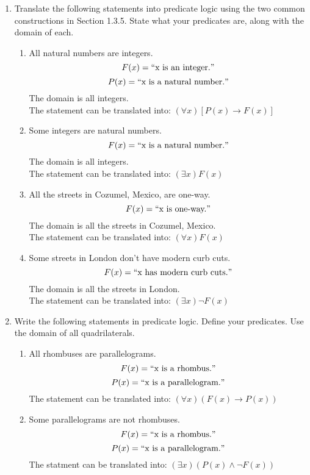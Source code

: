 \documentclass[12pt]{article}
\begin{document}
\begin{enumerate}
      \item Translate the following statements into predicate logic using the two common constructions in Section 1.3.5. State what your predicates are, along with the domain of each.
            \begin{enumerate}
                  \item All natural numbers are integers.
                        \[F(x) = \text{\textquotedblleft} \text{x is an integer.} \text{\textquotedblright}\]
                        \[P(x) = \text{\textquotedblleft} \text{x is a natural number.} \text{\textquotedblright}\]
                        The domain is all integers.\\
                        The statement can be translated into: $(\forall x)[P(x) \rightarrow F(x)]$
                  \item Some integers are natural numbers.
                        \[F(x) = \text{\textquotedblleft} \text{x is a natural number.} \text{\textquotedblright}\]
                        The domain is all integers.\\
                        The statement can be translated into: $(\exists x)F(x)$
                  \item All the streets in Cozumel, Mexico, are one-way.
                        \[F(x) = \text{\textquotedblleft} \text{x is one-way.} \text{\textquotedblright}\]
                        The domain is all the streets in Cozumel, Mexico.\\
                        The statement can be translated into: $(\forall x)F(x)$
                  \item Some streets in London don’t have modern curb cuts.
                        \[F(x) = \text{\textquotedblleft} \text{x has modern curb cuts.} \text{\textquotedblright}\]
                        The domain is all the streets in London.\\
                        The statement can be translated into: $(\exists x)\neg F(x)$
            \end{enumerate}

      \item Write the following statements in predicate logic. Define your predicates. Use the domain of all quadrilaterals.
            \begin{enumerate}
                  \item All rhombuses are parallelograms.
                        \[F(x) = \text{\textquotedblleft} \text{x is a rhombus.} \text{\textquotedblright}\]
                        \[P(x) = \text{\textquotedblleft} \text{x is a parallelogram.} \text{\textquotedblright}\]
                        The statement can be translated into: $(\forall x)(F(x) \rightarrow P(x))$
                  \item Some parallelograms are not rhombuses.
                        \[F(x) = \text{\textquotedblleft} \text{x is a rhombus.} \text{\textquotedblright}\]
                        \[P(x) = \text{\textquotedblleft} \text{x is a parallelogram.} \text{\textquotedblright}\]
                        The statment can be translated into: $(\exists x)(P(x) \wedge \neg F(x))$
            \end{enumerate}


\end{enumerate}
\end{document}
